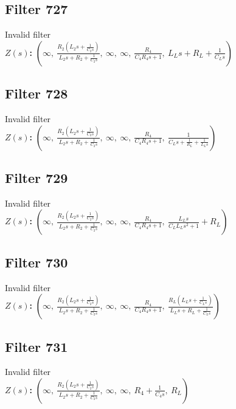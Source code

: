 \documentclass{article}
\begin{document}
\subsection*{Filter 727}
Invalid filter \\ 
\textbf{$Z(s)$:} $\left( \infty, \  \frac{R_{2} \left(L_{2} s + \frac{1}{C_{2} s}\right)}{L_{2} s + R_{2} + \frac{1}{C_{2} s}}, \  \infty, \  \infty, \  \frac{R_{4}}{C_{4} R_{4} s + 1}, \  L_{L} s + R_{L} + \frac{1}{C_{L} s}\right)$ \\ 
\subsection*{Filter 728}
Invalid filter \\ 
\textbf{$Z(s)$:} $\left( \infty, \  \frac{R_{2} \left(L_{2} s + \frac{1}{C_{2} s}\right)}{L_{2} s + R_{2} + \frac{1}{C_{2} s}}, \  \infty, \  \infty, \  \frac{R_{4}}{C_{4} R_{4} s + 1}, \  \frac{1}{C_{L} s + \frac{1}{R_{L}} + \frac{1}{L_{L} s}}\right)$ \\ 
\subsection*{Filter 729}
Invalid filter \\ 
\textbf{$Z(s)$:} $\left( \infty, \  \frac{R_{2} \left(L_{2} s + \frac{1}{C_{2} s}\right)}{L_{2} s + R_{2} + \frac{1}{C_{2} s}}, \  \infty, \  \infty, \  \frac{R_{4}}{C_{4} R_{4} s + 1}, \  \frac{L_{L} s}{C_{L} L_{L} s^{2} + 1} + R_{L}\right)$ \\ 
\subsection*{Filter 730}
Invalid filter \\ 
\textbf{$Z(s)$:} $\left( \infty, \  \frac{R_{2} \left(L_{2} s + \frac{1}{C_{2} s}\right)}{L_{2} s + R_{2} + \frac{1}{C_{2} s}}, \  \infty, \  \infty, \  \frac{R_{4}}{C_{4} R_{4} s + 1}, \  \frac{R_{L} \left(L_{L} s + \frac{1}{C_{L} s}\right)}{L_{L} s + R_{L} + \frac{1}{C_{L} s}}\right)$ \\ 
\subsection*{Filter 731}
Invalid filter \\ 
\textbf{$Z(s)$:} $\left( \infty, \  \frac{R_{2} \left(L_{2} s + \frac{1}{C_{2} s}\right)}{L_{2} s + R_{2} + \frac{1}{C_{2} s}}, \  \infty, \  \infty, \  R_{4} + \frac{1}{C_{4} s}, \  R_{L}\right)$ \\ 
\end{document}
